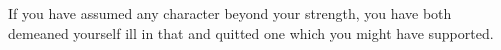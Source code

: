 If you have assumed any character  beyond your strength, you have both demeaned
yourself ill in that and quitted one which you might have supported.
